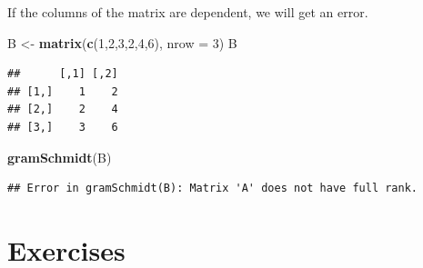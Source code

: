 \documentclass[
]{book}
\newenvironment{Shaded}{\begin{snugshade}}{\end{snugshade}}
\newcommand{\AttributeTok}[1]{\textcolor[rgb]{0.13,0.29,0.53}{#1}}
\newcommand{\DecValTok}[1]{\textcolor[rgb]{0.00,0.00,0.81}{#1}}
\newcommand{\FunctionTok}[1]{\textcolor[rgb]{0.13,0.29,0.53}{\textbf{#1}}}
\newcommand{\NormalTok}[1]{#1}
\newcommand{\OtherTok}[1]{\textcolor[rgb]{0.56,0.35,0.01}{#1}}
\theoremstyle{definition}
\theoremstyle{definition}
\theoremstyle{definition}
\theoremstyle{definition}
\theoremstyle{remark}
\begin{document}
If the columns of the matrix are dependent, we will get an error.

\begin{Shaded}
\begin{Highlighting}[]
\NormalTok{B }\OtherTok{\textless{}{-}} \FunctionTok{matrix}\NormalTok{(}\FunctionTok{c}\NormalTok{(}\DecValTok{1}\NormalTok{,}\DecValTok{2}\NormalTok{,}\DecValTok{3}\NormalTok{,}\DecValTok{2}\NormalTok{,}\DecValTok{4}\NormalTok{,}\DecValTok{6}\NormalTok{), }\AttributeTok{nrow =} \DecValTok{3}\NormalTok{)}
\NormalTok{B}
\end{Highlighting}
\end{Shaded}

\begin{verbatim}
##      [,1] [,2]
## [1,]    1    2
## [2,]    2    4
## [3,]    3    6
\end{verbatim}

\begin{Shaded}
\begin{Highlighting}[]
\FunctionTok{gramSchmidt}\NormalTok{(B)}
\end{Highlighting}
\end{Shaded}

\begin{verbatim}
## Error in gramSchmidt(B): Matrix 'A' does not have full rank.
\end{verbatim}

\section{Exercises}\label{exercises-3}
\end{document}
